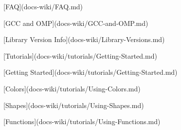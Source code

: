 
\begin{DoxyItemize}
\item \mbox{[}\-F\-A\-Q\mbox{]}(docs-\/wiki/\-F\-A\-Q.\-md)
\item \mbox{[}\-G\-C\-C and \-O\-M\-P\mbox{]}(docs-\/wiki/\-G\-C\-C-\/and-\/\-O\-M\-P.\-md)
\item \mbox{[}\-Library \-Version \-Info\mbox{]}(docs-\/wiki/\-Library-\/\-Versions.\-md)
\item \mbox{[}\-Tutorials\mbox{]}(docs-\/wiki/tutorials/\-Getting-\/\-Started.\-md)
\begin{DoxyItemize}
\item \mbox{[}\-Getting \-Started\mbox{]}(docs-\/wiki/tutorials/\-Getting-\/\-Started.\-md)
\item \mbox{[}\-Colors\mbox{]}(docs-\/wiki/tutorials/\-Using-\/\-Colors.\-md)
\item \mbox{[}\-Shapes\mbox{]}(docs-\/wiki/tutorials/\-Using-\/\-Shapes.\-md)
\item \mbox{[}\-Functions\mbox{]}(docs-\/wiki/tutorials/\-Using-\/\-Functions.\-md)
\end{DoxyItemize}
\end{DoxyItemize}